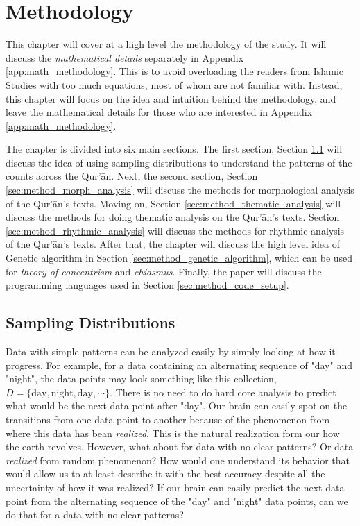 \chapter{Methodology}\label{ch:methodology}
This chapter will cover at a high level the methodology of the study. It will discuss the \textit{mathematical details} separately in Appendix \ref{app:math_methodology}. This is to avoid overloading the readers from Islamic Studies with too much equations, most of whom are not familiar with. Instead, this chapter will focus on the idea and intuition behind the methodology, and leave the mathematical details for those who are interested in Appendix \ref{app:math_methodology}.

The chapter is divided into six main sections. The first section, Section \ref{sec:method_prob_distribution} will discuss the idea of using sampling distributions to understand the patterns of the   counts across the Qur'\=an. Next, the second section, Section \ref{sec:method_morph_analysis} will discuss the methods for morphological analysis of the Qur'\=an's texts. Moving on, Section \ref{sec:method_thematic_analysis} will discuss the methods for doing thematic analysis on the Qur'\=an's texts. Section \ref{sec:method_rhythmic_analysis} will discuss the methods for rhythmic analysis of the Qur'\=an's texts. After that, the chapter will discuss the high level idea of Genetic algorithm in Section \ref{sec:method_genetic_algorithm}, which can be used for \textit{theory of concentrism} and \textit{chiasmus}. Finally, the paper will discuss the programming languages used in Section \ref{sec:method_code_setup}.
\section{Sampling Distributions}\label{sec:method_prob_distribution}
Data with simple patterns can be analyzed easily by simply looking at how it progress. For example, for a data containing an alternating sequence of "day" and "night", the data points may look something like this collection, $D=\{\text{day}, \text{night}, \text{day}, \cdots\}$. There is no need to do hard core analysis to predict what would be the next data point after "day". Our brain can easily spot on the transitions from one data point to another because of the phenomenon from where this data has bean \textit{realized}. This is the natural realization form our how the earth revolves. However, what about for data with no clear patterns? Or data \textit{realized} from random phenomenon? How would one understand its behavior that would allow us to at least describe it with the best accuracy despite all the uncertainty of how it was realized? If our brain can easily predict the next data point from the alternating sequence of the "day" and "night" data points, can we do that for a data with no clear patterns? 

